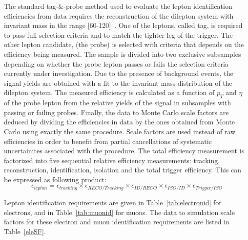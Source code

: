

The  standard tag-\&-probe method used to evaluate the lepton identification efficiencies
from data requires the reconstruction of 
the dilepton system with invariant mass in the range [60-120]~\GeVcc.  One of the
leptons, called tag, is required to pass full selection criteria and to match the tighter
leg of the trigger.
The other lepton candidate, (the probe) is selected with criteria that depends on
the efficiency being measured.
The sample is divided into two exclusive subsamples depending on whether
the probe lepton passes or fails the selection criteria currently under 
investigation. Due to the presence of background events, 
the signal yields are obtained with a fit to the invariant mass distribution of the
dilepton system. The measured efficiency is calculated as a function of $p_T$ and $\eta$
of the probe lepton from the relative yields
of the signal in subsamples with passing or failing probes.
Finally, the data to Monte Carlo scale factors are deduced by dividing the efficiencies
in data by the ones obtained from Monte Carlo using exactly the same procedure.
Scale factors are used instead of raw efficiencies in order to benefit from 
partial cancellations of systematic uncertainites associated with the procedure.
The total efficiency measurement is factorized into five sequential relative
efficiency measurements: tracking, reconstruction, identification, isolation 
and the total trigger efficiency.  This can be expressed as following product:
\begin{equation*}
\label{eq:efficiency}
\epsilon_{lepton} = \epsilon_{tracking} \times \epsilon_{RECO/Tracking} \times \epsilon_{ID/RECO} \times \epsilon_{ISO/ID} \times \epsilon_{Trigger/ISO} 
\end{equation*}

Lepton identification requirements are given in Table~\ref{tab:electronid} for electrons,
and in Table~\ref{tab:muonid} for muons. The data to simulation scale factors for these
electron and muon identification requirements are listed in Table~\ref{eleSF}.

